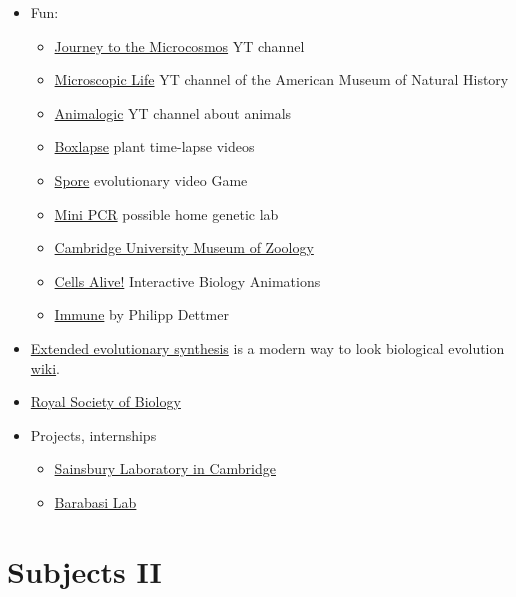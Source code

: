 \documentclass{article}
\begin{document}
\begin{itemize}
    \item Fun:
    \begin{itemize}
        \item \href{https://www.youtube.com/channel/UCBbnbBWJtwsf0jLGUwX5Q3g}{Journey to the Microcosmos} YT channel
        \item \href{https://www.youtube.com/playlist?list=PLrfcruGtplwH9gqNUy23btvvRuyhGw1sH}{Microscopic Life} YT channel of the American Museum of Natural History
        \item \href{https://www.youtube.com/channel/UCwg6_F2hDHYrqbNSGjmar4w}{Animalogic} YT channel about animals
        \item \href{https://www.youtube.com/@Boxlapse}{Boxlapse} plant time-lapse videos
        \item \href{https://www.spore.com/}{Spore} evolutionary video Game
        \item \href{https://www.minipcr.com/}{Mini PCR} possible home genetic lab
        \item \href{https://www.museum.zoo.cam.ac.uk/}{Cambridge University Museum of Zoology}
        \item \href{https://www.cellsalive.com/}{Cells Alive!} Interactive Biology Animations

        \item \href{https://www.goodreads.com/book/show/57423646-immune}{Immune} by Philipp Dettmer
    \end{itemize}
    
    \item \href{https://extendedevolutionarysynthesis.com/}{Extended evolutionary synthesis} is a modern way to look biological evolution \href{https://en.wikipedia.org/wiki/Extended_evolutionary_synthesis}{wiki}.

    \item \href{https://www.rsb.org.uk/}{Royal Society of Biology}
    
    \item Projects, internships
    \begin{itemize}
        \item \href{https://www.slcu.cam.ac.uk/people/gpsep}{Sainsbury Laboratory in Cambridge}
        \item \href{https://www.barabasilab.com/}{Barabasi Lab}
    \end{itemize}
    
\end{itemize}

\section{Subjects II}
\end{document}
